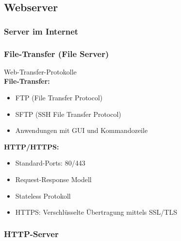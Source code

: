 
\pagebreak

\subsection{Webserver}

\subsubsection{Server im Internet}

\subsubsection{File-Transfer (File Server)}


\begin{definition}{Web-Transfer-Protokolle}\\
    \textbf{File-Transfer:}
    \begin{itemize}
        \item FTP (File Transfer Protocol)
        \item SFTP (SSH File Transfer Protocol)
        \item Anwendungen mit GUI und Kommandozeile
    \end{itemize}

    \textbf{HTTP/HTTPS:}
    \begin{itemize}
        \item Standard-Ports: 80/443
        \item Request-Response Modell
        \item Stateless Protokoll
        \item HTTPS: Verschlüsselte Übertragung mittels SSL/TLS
    \end{itemize}
\end{definition}

\subsubsection{HTTP-Server}

